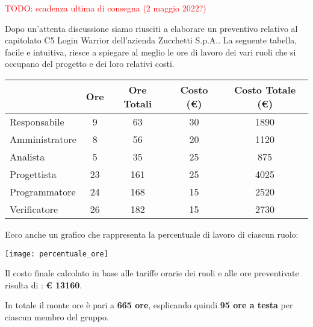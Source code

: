 \textcolor{red}{TODO: scadenza ultima di consegna (2 maggio 2022?)}

Dopo un’attenta discussione siamo riusciti a elaborare un preventivo relativo al capitolato C5 Login Warrior dell’azienda Zucchetti S.p.A.. La seguente tabella, facile e intuitiva, riesce a spiegare al meglio le ore di lavoro dei vari ruoli che si occupano del progetto e dei loro relativi costi.

\begin{center}
  \begin{tabular}{ |l|c|c|c|c| }
    \hline
                   & Ore & Ore Totali & Costo (€) & Costo Totale (€) \\
    \hline
    Responsabile   & 9   & 63         & 30        & 1890             \\
    \hline
    Amministratore & 8   & 56         & 20        & 1120             \\
    \hline
    Analista       & 5   & 35         & 25        & 875              \\
    \hline
    Progettista    & 23  & 161        & 25        & 4025             \\
    \hline
    Programmatore  & 24  & 168        & 15        & 2520             \\
    \hline
    Verificatore   & 26  & 182        & 15        & 2730             \\
    \hline
  \end{tabular}
\end{center}

Ecco anche un grafico che rappresenta la percentuale di lavoro di ciascun ruolo:
\begin{center}
  \texttt{[image: percentuale\_ore]}
\end{center}

Il costo finale calcolato in base alle tariffe orarie dei ruoli e alle ore preventivate risulta di : 
\textbf{€ 13160}.

In totale il monte ore è pari a \textbf{665 ore}, esplicando quindi \textbf{95 ore a testa} per ciascun membro del gruppo.